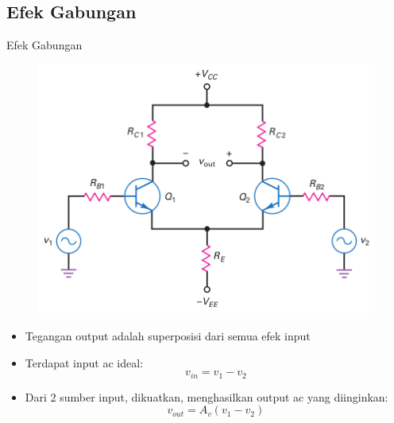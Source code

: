 \documentclass[aspectratio=169]{beamer}
\begin{document}
\subsection{Efek Gabungan}
\begin{frame}{Efek Gabungan}
	\begin{multicols}{2}
		\begin{figure}
			\centering
			\includegraphics[height=0.6\textheight]{gambar/01.output_of_diff_amp_includes_desired_signal_and_error_voltage}
		\end{figure}
		\columnbreak
		\begin{itemize}
			\item Tegangan output adalah superposisi dari semua efek input
			\item Terdapat input ac ideal: $$ v_{in} = v_1 - v_2 $$
			\item Dari 2 sumber input, dikuatkan, menghasilkan output ac yang diinginkan: $$ v_{out} = A_v(v_1 - v_2) $$
		\end{itemize}
	\end{multicols}
\end{frame}
\end{document}
